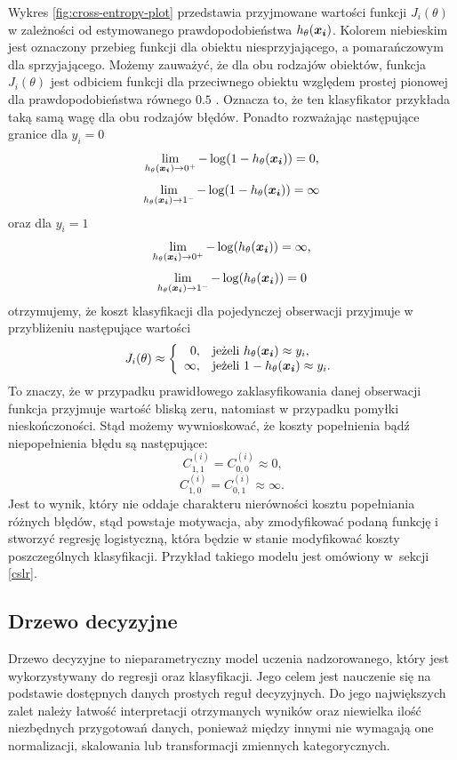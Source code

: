 \documentclass[inzynierska]{pwr_wmat_praca_dyplomowa}
\theoremstyle{plain}
\numberwithin{theorem}{chapter}
\theoremstyle{definition}
\numberwithin{theorem}{chapter}
\begin{document}
Wykres \ref{fig:cross-entropy-plot} przedstawia przyjmowane wartości funkcji $J_i(\theta)$ w zależności od estymowanego prawdopodobieństwa $h_{\theta}(\boldsymbol{x_i})$. Kolorem niebieskim jest oznaczony przebieg funkcji dla obiektu niesprzyjającego, a pomarańczowym dla sprzyjającego. Możemy zauważyć, że dla obu rodzajów obiektów, funkcja $J_i(\theta)$ jest odbiciem funkcji dla przeciwnego obiektu względem prostej pionowej dla prawdopodobieństwa równego $0.5$ . Oznacza to, że ten klasyfikator przykłada taką samą wagę dla obu rodzajów błędów. Ponadto rozważając następujące granice dla $y_i=0$
$$ \lim\limits_{h_{\theta}(\boldsymbol{x_i})\to 0^+} -\log(1-h_{\theta}(\boldsymbol{x_i})) = 0 \text{,}$$
$$ \lim\limits_{h_{\theta}(\boldsymbol{x_i})\to 1^-} -\log(1-h_{\theta}(\boldsymbol{x_i})) = \infty $$
oraz dla $y_i=1$
$$ \lim\limits_{h_{\theta}(\boldsymbol{x_i})\to 0^+} -\log(h_{\theta}(\boldsymbol{x_i})) = \infty \text{,}$$
$$ \lim\limits_{h_{\theta}(\boldsymbol{x_i})\to 1^-} -\log(h_{\theta}(\boldsymbol{x_i})) = 0 $$
otrzymujemy, że koszt klasyfikacji dla pojedynczej obserwacji przyjmuje w przybliżeniu następujące wartości
$$
J_i(\theta) \approx \left\{
\begin{array}{rl}
0, &\mbox{jeżeli $h_{\theta}(\boldsymbol{x_i}) \approx y_i$}, \\
\infty, &\mbox{jeżeli $1 - h_{\theta}(\boldsymbol{x_i}) \approx y_i$}.
\end{array}{}
\right.
$$
To znaczy, że w przypadku prawidłowego zaklasyfikowania danej obserwacji funkcja przyjmuje wartość bliską zeru, natomiast w przypadku pomyłki nieskończoności. Stąd możemy wywnioskować, że koszty popełnienia bądź niepopełnienia błędu są następujące:
$$ C^{(i)}_{1,1} = C^{(i)}_{0,0} \approx 0 \text{,}$$
$$ C^{(i)}_{1,0} = C^{(i)}_{0,1} \approx \infty \text{.}$$
Jest to wynik, który nie oddaje charakteru nierówności kosztu popełniania różnych błędów, stąd powstaje motywacja, aby zmodyfikować podaną funkcję i stworzyć regresję logistyczną, która będzie w stanie modyfikować koszty poszczególnych klasyfikacji. Przykład takiego modelu jest omówiony w~sekcji \ref{cslr}.

\subsection{Drzewo decyzyjne}
\label{drzewo}
Drzewo decyzyjne to nieparametryczny model uczenia nadzorowanego, który jest wykorzystywany do regresji oraz klasyfikacji. Jego celem jest nauczenie się na podstawie dostępnych danych prostych reguł decyzyjnych. Do jego największych zalet należy łatwość interpretacji otrzymanych wyników oraz niewielka ilość niezbędnych przygotowań danych, ponieważ między innymi nie wymagają one normalizacji, skalowania lub transformacji zmiennych kategorycznych.
\end{document}
